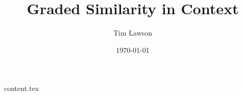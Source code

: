 \documentclass[10pt,twocolumn]{extarticle}
\begin{document}
\title{Graded Similarity in Context}
\author{Tim Lawson}
\date{\today}

\maketitle

{content.tex}

\printbibliography
\end{document}
